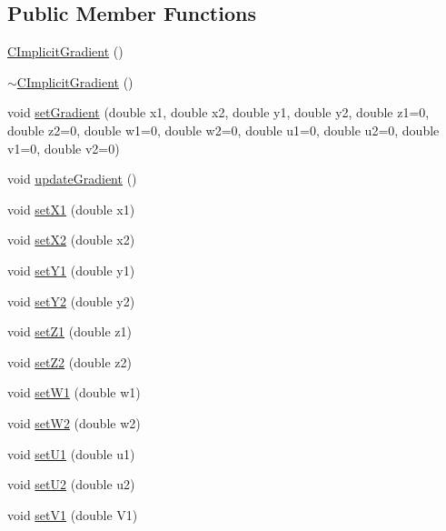 \subsection*{Public Member Functions}
\begin{DoxyCompactItemize}
\item 
\hyperlink{classanl_1_1CImplicitGradient_ae6fd70090f4622f4210c4515a7836068}{CImplicitGradient} ()
\item 
\hyperlink{classanl_1_1CImplicitGradient_a3c3563e493a8f017b736f190152db021}{$\sim$CImplicitGradient} ()
\item 
void \hyperlink{classanl_1_1CImplicitGradient_ac24f690633c2fa077e04dd140c3adc93}{setGradient} (double x1, double x2, double y1, double y2, double z1=0, double z2=0, double w1=0, double w2=0, double u1=0, double u2=0, double v1=0, double v2=0)
\item 
void \hyperlink{classanl_1_1CImplicitGradient_a1b8ee89bf3282588267e9abd6796075d}{updateGradient} ()
\item 
void \hyperlink{classanl_1_1CImplicitGradient_a92fc2f1ebea06d2811b86a59a2a9112d}{setX1} (double x1)
\item 
void \hyperlink{classanl_1_1CImplicitGradient_a56bc55299169ca06c547431f8883d0af}{setX2} (double x2)
\item 
void \hyperlink{classanl_1_1CImplicitGradient_a2e83bc1f5698930436a0907804c87dd5}{setY1} (double y1)
\item 
void \hyperlink{classanl_1_1CImplicitGradient_a4353cff88c0c98a284c66e1c6b3a84de}{setY2} (double y2)
\item 
void \hyperlink{classanl_1_1CImplicitGradient_a7e23b3dc8a8dfd5dd46e5edf127510e7}{setZ1} (double z1)
\item 
void \hyperlink{classanl_1_1CImplicitGradient_ada64c9ffcc4f6f2c64adda183647080d}{setZ2} (double z2)
\item 
void \hyperlink{classanl_1_1CImplicitGradient_ae9976236fdbdd862dede555cf44417a4}{setW1} (double w1)
\item 
void \hyperlink{classanl_1_1CImplicitGradient_a6a35bdf98a8e3512c7b2d5032263d517}{setW2} (double w2)
\item 
void \hyperlink{classanl_1_1CImplicitGradient_ae5cb2ee2f2899f2a60707b0f10dbcf7c}{setU1} (double u1)
\item 
void \hyperlink{classanl_1_1CImplicitGradient_aefc10b99819384660f8d759fdef439d8}{setU2} (double u2)
\item 
void \hyperlink{classanl_1_1CImplicitGradient_a69033f6c71e0331b79df6841b6172de7}{setV1} (double V1)

\end{DoxyCompactItemize}
